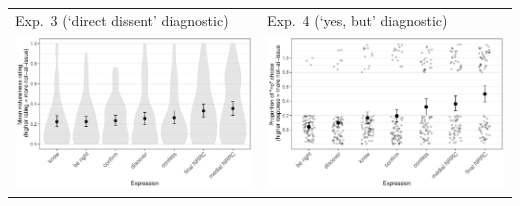 \documentclass[compress, xcolor = dvipsnames, aspectratio=169]{beamer}
\begin{document}
\begin{frame}[t]
\begin{center}
\begin{tabular}{p{.4\linewidth} p{.4\linewidth}}
	      		\\
	      		{\centering Exp.~3 (`direct dissent' diagnostic)} &
				{\centering Exp.~4 (`yes, but' diagnostic)} \\
	      		\includegraphics[width=\linewidth]{../../results/exp3/graphs/mean-ratings.pdf}
	      		&
	      		\includegraphics[width=\linewidth]{../../results/exp4/graphs/mean-ratings.pdf}
	      		\\
			\end{tabular}
		\end{center}
	
	\end{frame}
\end{document}
